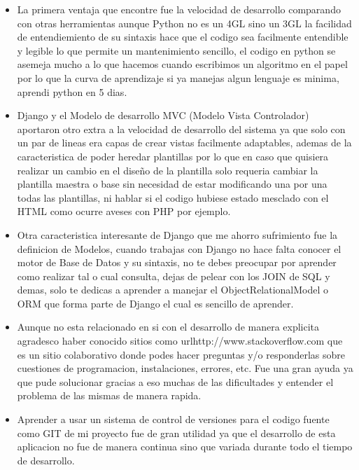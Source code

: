 \begin{itemize}
    \item La primera ventaja que encontre fue la velocidad de desarrollo 
        comparando con otras herramientas aunque Python no es un 4GL sino un 
        3GL la facilidad de entendiemiento de su sintaxis hace que el codigo
        sea facilmente entendible y legible lo que permite un mantenimiento 
        sencillo, el codigo en python se asemeja mucho a lo que hacemos cuando 
        escribimos un algoritmo en el papel por lo que la curva de aprendizaje
        si ya manejas algun lenguaje es minima, aprendi python en 5 dias.

    \item Django y el Modelo de desarrollo MVC (Modelo Vista Controlador) 
        aportaron otro extra a la velocidad de desarrollo del sistema ya que 
        solo con un par de lineas era capas de crear vistas facilmente 
        adaptables, ademas de la caracteristica de poder heredar plantillas 
        por lo que en caso que quisiera realizar un cambio en el diseño de la 
        plantilla solo requeria cambiar la plantilla maestra o base sin 
        necesidad de estar modificando una por una todas las plantillas, ni 
        hablar si el codigo hubiese estado mesclado con el HTML como ocurre 
        aveses con PHP por ejemplo.

    \item Otra caracteristica interesante de Django que me ahorro sufrimiento
        fue la definicion de Modelos, cuando trabajas con Django no hace falta
        conocer el motor de Base de Datos y su sintaxis, no te debes preocupar 
        por aprender como realizar tal o cual consulta, dejas de pelear con 
        los JOIN de SQL y demas, solo te dedicas a aprender a manejar el 
        ObjectRelationalModel o ORM que forma parte de Django el cual es 
        sencillo de aprender.

    \item Aunque no esta relacionado en si con el desarrollo de manera explicita
        agradesco haber conocido sitios como url{http://www.stackoverflow.com}
        que es un sitio colaborativo donde podes hacer preguntas y/o responderlas
        sobre cuestiones de programacion, instalaciones, errores, etc. Fue una 
        gran ayuda ya que pude solucionar gracias a eso muchas de las 
        dificultades y entender el problema de las mismas de manera rapida.

    \item Aprender a usar un sistema de control de versiones para el codigo 
        fuente como GIT de mi proyecto fue de gran utilidad ya que el desarrollo de esta 
        aplicacion no fue de manera continua sino que variada durante todo el 
        tiempo de desarrollo.
\end{itemize}


